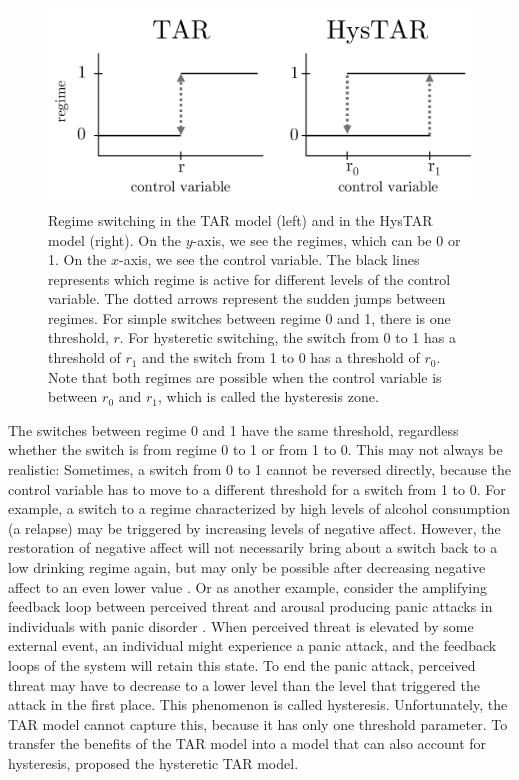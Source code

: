 \documentclass{article}
\begin{document}
\begin{figure}
\centering
\includegraphics[scale=0.5]{tar_vs_hystar}
\caption{Regime switching in the TAR model (left) and in the HysTAR model (right). On the $y$-axis, we see the regimes, which can be 0 or 1. On the $x$-axis, we see the control variable. 
The black lines represents which regime is active for different levels of the control variable. The dotted arrows represent the sudden jumps between regimes.
For simple switches between regime 0 and 1, there is one threshold, $r$. For hysteretic switching, the switch from 0 to 1 has a threshold of $r_1$ and the switch from 1 to 0 has a threshold of $r_0$. Note that both regimes are possible when the control variable is between $r_0$ and $r_1$, which is called the hysteresis zone.}
\label{fig:tar_vs_hystar}
\end{figure}

The switches between regime 0 and 1 have the same threshold, regardless whether the switch is from regime 0 to 1 or from 1 to 0. 
This may not always be realistic: Sometimes, a switch from 0 to 1 cannot be reversed directly, because the control variable has to move to a different threshold for a switch from 1 to 0.
For example, a switch to a regime characterized by high levels of alcohol consumption (a relapse) may be triggered by increasing levels of negative affect.
However, the restoration of negative affect will not necessarily bring about a switch back to a low drinking regime again, but may only be possible after decreasing negative affect to an even lower value \citep{alcohol_example}.
Or as another example, consider the amplifying feedback loop between perceived threat and arousal producing panic attacks in individuals with panic disorder \citep{panic_disorder}.
When perceived threat is elevated by some external event, an individual might experience a panic attack, and the feedback loops of the system will retain this state.
To end the panic attack, perceived threat may have to decrease to a lower level than the level that triggered the attack in the first place.
This phenomenon is called hysteresis.
Unfortunately, the TAR model cannot capture this, because it has only one threshold parameter.
To transfer the benefits of the TAR model into a model that can also account for hysteresis, \citet{bar2} proposed the hysteretic TAR model.
\end{document}

